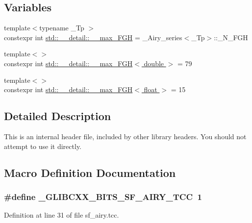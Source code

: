 \subsection*{Variables}
\begin{DoxyCompactItemize}
\item 
{\footnotesize template$<$typename \+\_\+\+Tp $>$ }\\constexpr int \hyperlink{namespacestd_1_1____detail_ae3ef7007b55cd83fa162820c809a2995}{std\+::\+\_\+\+\_\+detail\+::\+\_\+\+\_\+max\+\_\+\+F\+GH} = \+\_\+\+Airy\+\_\+series$<$\+\_\+\+Tp$>$\+::\+\_\+\+N\+\_\+\+F\+GH
\item 
{\footnotesize template$<$$>$ }\\constexpr int \hyperlink{namespacestd_1_1____detail_ac945c3d1897eb356e75d379f67367a4b}{std\+::\+\_\+\+\_\+detail\+::\+\_\+\+\_\+max\+\_\+\+F\+G\+H$<$ double $>$} = 79
\item 
{\footnotesize template$<$$>$ }\\constexpr int \hyperlink{namespacestd_1_1____detail_a67195934ce49105fd7b765e669a5a2a0}{std\+::\+\_\+\+\_\+detail\+::\+\_\+\+\_\+max\+\_\+\+F\+G\+H$<$ float $>$} = 15
\end{DoxyCompactItemize}


\subsection{Detailed Description}
This is an internal header file, included by other library headers. You should not attempt to use it directly. 

\subsection{Macro Definition Documentation}
\subsubsection[{\texorpdfstring{\+\_\+\+G\+L\+I\+B\+C\+X\+X\+\_\+\+B\+I\+T\+S\+\_\+\+S\+F\+\_\+\+A\+I\+R\+Y\+\_\+\+T\+CC}{_GLIBCXX_BITS_SF_AIRY_TCC}}]{\setlength{\rightskip}{0pt plus 5cm}\#define \+\_\+\+G\+L\+I\+B\+C\+X\+X\+\_\+\+B\+I\+T\+S\+\_\+\+S\+F\+\_\+\+A\+I\+R\+Y\+\_\+\+T\+CC~1}\hypertarget{sf__airy_8tcc_a2368d5b1edfb2e14f2c283d87ab89943}{}\label{sf__airy_8tcc_a2368d5b1edfb2e14f2c283d87ab89943}


Definition at line 31 of file sf\+\_\+airy.\+tcc.

